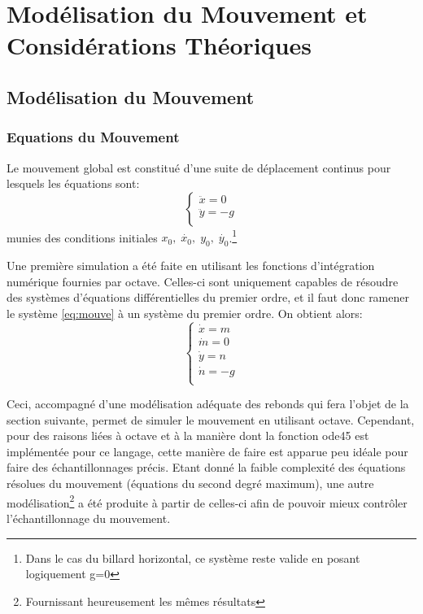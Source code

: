 \documentclass[a4paper]{report}
\begin{document}
\chapter{Modélisation du Mouvement et Considérations Théoriques}
\label{chap:modelisat}
\section{Modélisation du Mouvement}
\subsection{Equations du Mouvement}
Le mouvement global est constitué d'une suite de déplacement continus pour lesquels les équations sont:
\begin{equation}
\label{eq:mouve}
\begin{cases}
   \ddot{x}=0\\
   \ddot{y}=-g\\
\end{cases}
\end{equation}
munies des conditions initiales \(x_0, \; \dot{x_0}, \; y_0, \; \dot{y_0} \).\footnote{Dans le cas du billard horizontal, ce système reste valide en posant logiquement g=0}

Une première simulation a été faite en utilisant les fonctions d'intégration numérique fournies par octave. Celles-ci sont uniquement capables de résoudre des systèmes d'équations différentielles du premier ordre, et il faut donc ramener le système \ref{eq:mouve} à un système du premier ordre. On obtient alors:
\begin{equation}
\begin{cases}
   \dot{x}=m\\
   \dot{m}=0\\
   \dot{y}=n\\
   \dot{n}=-g\\
\end{cases}
\end{equation}

Ceci, accompagné d'une modélisation adéquate des rebonds qui fera l'objet de la section suivante, permet de simuler le mouvement en utilisant octave. Cependant, pour des raisons liées à octave et à la manière dont la fonction ode45 est implémentée pour ce langage, cette manière de faire est apparue peu idéale pour faire des échantillonnages précis. Etant donné la faible complexité des équations résolues du mouvement (équations du second degré maximum), une autre modélisation\footnote{Fournissant heureusement les mêmes résultats} a été produite à partir de celles-ci afin de pouvoir mieux contrôler l'échantillonnage du mouvement.
\end{document}

